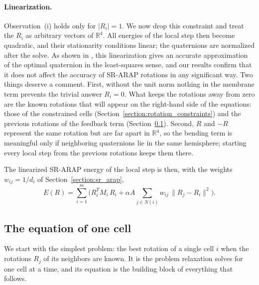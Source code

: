 \documentclass{birkjour}
\theoremstyle{remark}
\numberwithin{equation}{section}
\begin{document}
\paragraph{Linearization.} Observation~(i) holds only for $|R_i| = 1$. We now drop this constraint and treat the $R_i$ as arbitrary vectors of $\mathbb R^4$. All energies of the local step then become quadratic, and their stationarity conditions linear; the quaternions are normalized after the solve. As shown in \cite{Ligare2020}, this linearization gives an accurate approximation of the optimal quaternion in the least-squares sense, and our results confirm that it does not affect the accuracy of SR-ARAP rotations in any significant way. Two things deserve a comment. First, without the unit norm nothing in the membrane term prevents the trivial answer $R_i = 0$. What keeps the rotations away from zero are the known rotations that will appear on the right-hand side of the equations: those of the constrained cells (Section~\ref{section:rotation_constraints}) and the previous rotations of the feedback term (Section~\ref{section:one_cell}). Second, $R$ and $-R$ represent the same rotation but are far apart in $\mathbb R^4$, so the bending term is meaningful only if neighboring quaternions lie in the same hemisphere; starting every local step from the previous rotations keeps them there.

The linearized SR-ARAP energy of the local step is then, with the weights $w_{ij} = 1/d_i$ of Section~\ref{section:sr_arap},
\begin{equation}
\label{eq:local_energy}
E(R) = \sum_{i=1}^m \Big( R_i^T M_i \, R_i + \alpha A \sum_{j \in N(i)} w_{ij} \, \| R_j - R_i \|^2 \Big).
\end{equation}

\subsection{The equation of one cell}
\label{section:one_cell}

We start with the simplest problem: the best rotation of a single cell $i$ when the rotations $R_j$ of its neighbors are known. It is the problem relaxation solves for one cell at a time, and its equation is the building block of everything that follows.
\end{document}
